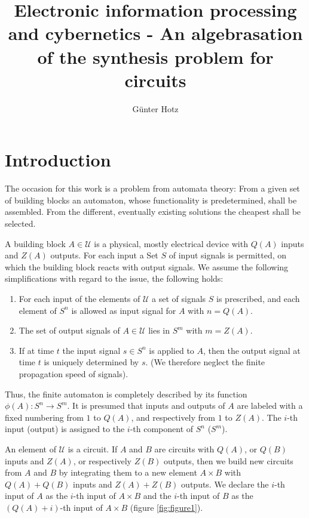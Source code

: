 \documentclass{article}
\begin{document}
\title{Electronic information processing and cybernetics - An algebrasation of the synthesis problem for circuits}
\author{Günter Hotz}
\maketitle

\section{Introduction}
The occasion for this work is a problem from automata theory: From a given set of building blocks an automaton, whose functionality is predetermined, shall be assembled. From the different, eventually existing  solutions the cheapest shall be selected. 

A building block $A \in \mathcal{U}$ is a physical, mostly electrical device with $Q(A)$ inputs and $Z(A)$ outputs. For each input a Set $S$ of input signals is permitted, on which the building block reacts with output signals. We assume the following simplifications with regard to the issue, the following holds:

\begin{enumerate}
\item For each input of the elements of $\mathcal{U}$ a set of signals $S$ is prescribed, and each element of $S^n$ is allowed as input signal for $A$ with $n = Q(A)$.
\item The set of output signals of $A \in \mathcal{U}$ lies in $S^m$ with $m = Z(A)$.
\item If at time $t$ the input signal $s \in S^n$ is applied to $A$, then the output signal at time $t$ is uniquely determined by $s$. (We therefore neglect the finite propagation speed of signals).
\end{enumerate}

Thus, the finite automaton is completely described by its function $\phi(A):S^n \rightarrow S^m$. It is presumed that inputs and outputs of $A$ are labeled with a fixed numbering from $1$ to $Q(A)$, and respectively from $1$ to $Z(A)$. The $i$-th input (output) is assigned to the $i$-th component of $S^n$ ($S^m$). 

An element of $\mathcal{U}$ is a circuit. If $A$ and $B$ are circuits with $Q(A)$, or $Q(B)$ inputs and $Z(A)$, or respectively $Z(B)$ outputs, then we build new circuits from $A$ and $B$ by integrating them to a new element $A\times B$ with $Q(A)+Q(B)$ inputs and $Z(A)+Z(B)$ outputs. We declare the $i$-th input of $A$ as the $i$-th input of $A\times B$ and the $i$-th input of $B$ as the $(Q(A) + i)$-th input of $A\times B$ (figure \ref{fig:figure1}).
\end{document}
